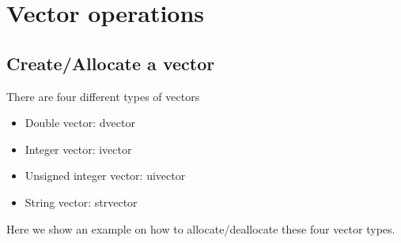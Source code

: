 \documentclass[letterpaper,10pt,english]{sphinxmanual}
\begin{document}
\chapter{Vector operations}
\label{\detokenize{GettingStartedInC:vector-operations}}

\section{Create/Allocate a vector}
\label{\detokenize{GettingStartedInC:create-allocate-a-vector}}
\sphinxAtStartPar
There are four different types of vectors
\begin{itemize}
\item {} 
\sphinxAtStartPar
Double vector: dvector

\item {} 
\sphinxAtStartPar
Integer vector: ivector

\item {} 
\sphinxAtStartPar
Unsigned integer vector: uivector

\item {} 
\sphinxAtStartPar
String vector: strvector

\end{itemize}

\sphinxAtStartPar
Here we show an example on how to allocate/deallocate these four vector types.
\end{document}
